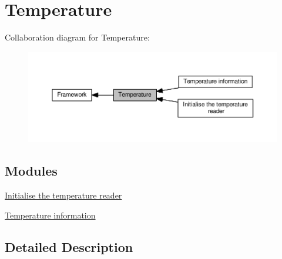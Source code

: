 \hypertarget{group___temperature}{}\section{Temperature}
\label{group___temperature}
Collaboration diagram for Temperature\+:\nopagebreak
\begin{figure}[H]
\begin{center}
\leavevmode
\includegraphics[width=350pt]{de/d0e/group___temperature}
\end{center}
\end{figure}
\subsection*{Modules}
\begin{DoxyCompactItemize}
\item 
\hyperlink{group___temperature___init}{Initialise the temperature reader}
\item 
\hyperlink{group___temperature___data}{Temperature information}
\end{DoxyCompactItemize}


\subsection{Detailed Description}
